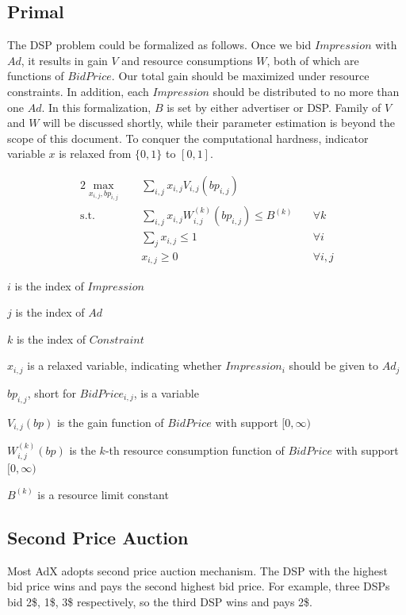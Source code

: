 \documentclass[sigconf]{acmart}
\newcommand{\sumj}{\sum\limits_j}
\newcommand{\sumij}{\sum\limits_{i,j}}
\newcommand{\sx}{x_{i,j}}
\newcommand{\sbp}{bp_{i,j}}
\newcommand{\sV}{V_{i,j}}
\newcommand{\sW}{W_{i,j}^{(k)}}
\newcommand{\sB}{B^{(k)}}
\newcommand{\dspresourceconstraint}{\sumij \sx \sW(\sbp) \le \sB}
\newcommand{\assignmentconstraint}{\sumj \sx \le 1}
\begin{document}
\subsection{Primal}

The DSP problem could be formalized as follows.
Once we bid $Impression$ with $Ad$, it results in gain $V$ and resource consumptions $W$, both of which are functions of $BidPrice$.
Our total gain should be maximized under resource constraints.
In addition, each $Impression$ should be distributed to no more than one $Ad$.
In this formalization, $B$ is set by either advertiser or DSP.
Family of $V$ and $W$ will be discussed shortly, while their parameter estimation is beyond the scope of this document.
To conquer the computational hardness, indicator variable $x$ is relaxed from $\{0, 1\}$ to $[0, 1]$.

\begin{alignat}{2}
    \max\limits_{\sx, \sbp} \quad & \sumij \sx \sV(\sbp) \quad    & {} \\
    \mbox{s.t.} \quad             & \dspresourceconstraint \quad  & \forall k \\
    \quad                         & \assignmentconstraint \quad   & \forall i \\
    \quad                         & \sx \ge 0 \quad               & \forall i,j
\end{alignat}

$i$ is the index of $Impression$

$j$ is the index of $Ad$

$k$ is the index of $Constraint$

$\sx$ is a relaxed variable, indicating whether $Impression_i$ should be given to $Ad_j$

$\sbp$, short for $BidPrice_{i,j}$, is a variable

$\sV(bp)$ is the gain function of $BidPrice$ with support $[0, \infty)$

$\sW(bp)$ is the $k$-th resource consumption function of $BidPrice$ with support $[0, \infty)$

$\sB$ is a resource limit constant

\subsection{Second Price Auction}

Most AdX adopts second price auction mechanism.
The DSP with the highest bid price wins and pays the second highest bid price.
For example, three DSPs bid 2\$, 1\$, 3\$ respectively, so the third DSP wins and pays 2\$. 
\end{document}

